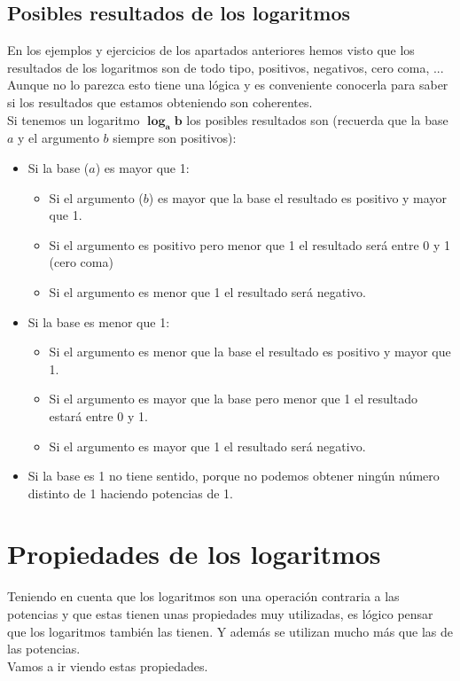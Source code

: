 \documentclass[a4paper,10pt,answers]{exam}
\begin{document}
\subsection{Posibles resultados de los logaritmos}
En los ejemplos y ejercicios de los apartados anteriores hemos visto que los resultados de los logaritmos son de todo tipo, positivos, negativos, cero coma, ...\\
Aunque no lo parezca esto tiene una lógica y es conveniente conocerla para saber si los resultados que estamos obteniendo son coherentes.\\
Si tenemos un logaritmo $\boldsymbol{\log_a b}$ los posibles resultados son (recuerda que la base $a$ y el argumento $b$ siempre son positivos):
\begin{itemize}
	\item Si la base ($a$) es mayor que 1:
	\begin{itemize}
		\item Si el argumento ($b$) es mayor que la base el resultado es positivo y mayor que 1.
		\item Si el argumento es positivo pero menor que 1 el resultado será entre 0 y 1 (cero coma)
		\item Si el argumento es menor que 1 el resultado será negativo.
	\end{itemize}
	\item Si la base es menor que 1:
	\begin{itemize}
		\item Si el argumento es menor que la base el resultado es positivo y mayor que 1.
		\item Si el argumento es mayor que la base pero menor que 1 el resultado estará entre 0 y 1.
		\item Si el argumento es mayor que 1 el resultado será negativo.
	\end{itemize}
	\item Si la base es 1 no tiene sentido, porque no podemos obtener ningún número distinto de 1 haciendo potencias de 1.
\end{itemize}
\section{Propiedades de los logaritmos}
Teniendo en cuenta que los logaritmos son una operación contraria a las potencias y que estas tienen unas propiedades muy utilizadas, es lógico pensar que los logaritmos también las tienen. Y además se utilizan mucho más que las de las potencias.\\
Vamos a ir viendo estas propiedades.
\end{document}
